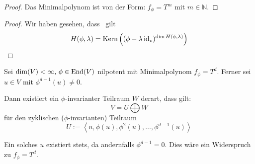 \documentclass[parskip,a4paper,twoside,DIV15,BCOR12mm]{scrbook}
\begin{document}
\begin{proof}
Das Minimalpolynom ist von der Form: \(f_{\phi}=T^{m}\) mit \(m\in\mathbb{N}\).
\end{proof}
\begin{comment}[2]
Für beliebiges \(\phi\in\End(V)\) und \(\dim(V)<\infty\) ist
\((\phi-\lambda\id_{v})|_{H(\phi,\lambda)}\) nilpotent.
\end{comment}
\begin{proof}
Wir haben gesehen, dass \ gilt
\[
H(\phi,\lambda)=\operatorname{Kern}\left((\phi-\lambda\operatorname{id}_{v})^{\dim H(\phi,\lambda)}\right)
\]
\end{proof}
\begin{supptheo}
\label{Hilfssatz 14.1}
Sei \(\dim(V)<\infty,\,\phi\in\operatorname{End}(V)\) nilpotent mit Minimalpolynom 
\(f_{\phi}=T^{d}\). Ferner sei \(u\in V\) mit \(\phi^{d-1}(u)\neq0\).

Dann existiert ein \(\phi\)-invarianter Teilraum \(W\) derart, dass gilt:
\[
V=U\bigoplus W
\]
für den zyklischen (\(\phi\)-invarianten) Teilraum
\[
U:=\left\langle u,\phi(u),\phi^{2}(u),\ldots,\phi^{d-1}(u)\right\rangle
\]
\end{supptheo}
\begin{note}
Ein solches \(u\) existiert stets, da andernfalls \(\phi^{d-1}=0\). Dies wäre
ein Widerspruch zu \(f_{\phi}=T^{d}\).
\end{note}
\end{document}
